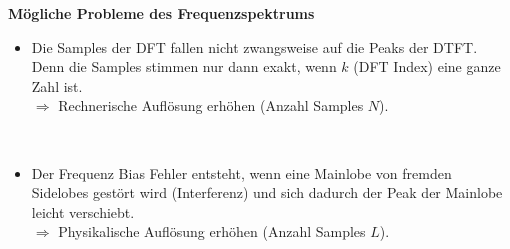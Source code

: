\newpage
		\textbf{Mögliche Probleme des Frequenzspektrums}\\[0.2cm]
		\begin{minipage}{0.8\textwidth}
		\begin{itemize}
		 \item Die Samples der DFT fallen nicht zwangsweise auf die Peaks der DTFT. Denn die Samples stimmen nur dann exakt, wenn $k$ (DFT Index) eine ganze Zahl ist.\\
		 $\Rightarrow$ Rechnerische Auflösung erhöhen (Anzahl Samples $N$).
		\end{itemize}
		\end{minipage}\begin{minipage}{0.05\textwidth} $ $\end{minipage}
		\begin{minipage}{0.15\textwidth}
		\end{minipage}
		\begin{itemize}
		 \item Der Frequenz Bias Fehler entsteht, wenn eine Mainlobe von fremden Sidelobes gestört wird (Interferenz) und sich dadurch der Peak der Mainlobe leicht verschiebt.\\
		 $\Rightarrow$ Physikalische Auflösung erhöhen (Anzahl Samples $L$).
		\end{itemize}

